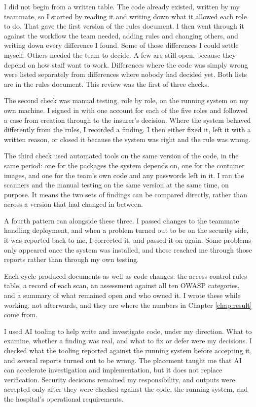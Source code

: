 I did not begin from a written table. The code already existed, written by my teammate, so I started by reading it and writing down what it allowed each role to do. That gave the first version of the rules document. I then went through it against the workflow the team needed, adding rules and changing others, and writing down every difference I found. Some of those differences I could settle myself. Others needed the team to decide. A few are still open, because they depend on how staff want to work. Differences where the code was simply wrong were listed separately from differences where nobody had decided yet. Both lists are in the rules document. This review was the first of three checks.

The second check was manual testing, role by role, on the running system on my own machine. I signed in with one account for each of the five roles and followed a case from creation through to the insurer's decision. Where the system behaved differently from the rules, I recorded a finding. I then either fixed it, left it with a written reason, or closed it because the system was right and the rule was wrong.

The third check used automated tools on the same version of the code, in the same period: one for the packages the system depends on, one for the container images, and one for the team's own code and any passwords left in it. I ran the scanners and the manual testing on the same version at the same time, on purpose. It means the two sets of findings can be compared directly, rather than across a version that had changed in between.

A fourth pattern ran alongside these three. I passed changes to the teammate handling deployment, and when a problem turned out to be on the security side, it was reported back to me, I corrected it, and passed it on again. Some problems only appeared once the system was installed, and those reached me through those reports rather than through my own testing.

Each cycle produced documents as well as code changes: the access control rules table, a record of each scan, an assessment against all ten OWASP categories, and a summary of what remained open and who owned it. I wrote these while working, not afterwards, and they are where the numbers in Chapter \ref{chap:result} come from.

I used AI tooling to help write and investigate code, under my direction. What to examine, whether a finding was real, and what to fix or defer were my decisions. I checked what the tooling reported against the running system before accepting it, and several reports turned out to be wrong. The placement taught me that AI can accelerate investigation and implementation, but it does not replace verification. Security decisions remained my responsibility, and outputs were accepted only after they were checked against the code, the running system, and the hospital's operational requirements.

